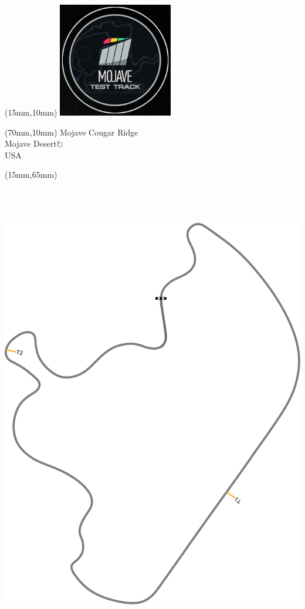 \null\newpage
\begin{textblock*}{50mm}(15mm,10mm)%
\includegraphics[width=50mm]{LG/MOJA.png}
\end{textblock*}
\begin{textblock*}{130mm}(70mm,10mm)%
{\fontsize{20}{20}\selectfont Mojave Cougar Ridge\\}
{\fontsize{16}{16}\selectfont Mojave Desert\hfill \Large$\circlearrowright$\\}
{\fontsize{12}{12}\selectfont USA\\}
\end{textblock*}
\begin{textblock*}{185mm}(15mm,65mm)%
\centering
\mbox{\includegraphics[width=185mm,height=210mm,keepaspectratio]{PT/MOJACR.pdf}}
\end{textblock*}
